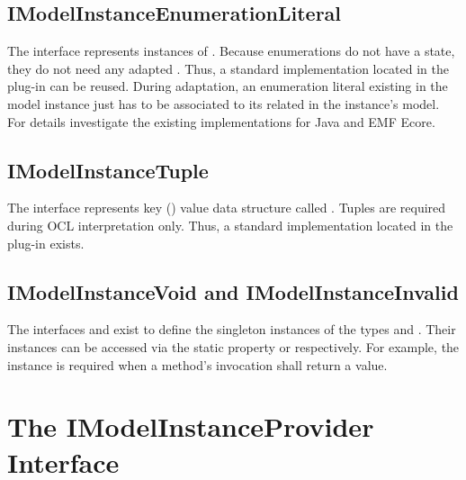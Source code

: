 \subsection{IModelInstanceEnumerationLiteral}

The interface  represents instances of . Because enumerations do not have a state, they do not need any adapted . Thus, a standard  implementation located in the plug-in  can be reused. During adaptation, an enumeration literal existing in the model instance just has to be associated to its related  in the instance's model. For details investigate the existing  implementations for Java and \acs{EMF} Ecore.


\subsection{IModelInstanceTuple}

The interface  represents key () value  data structure called . Tuples are required during \acs{OCL} interpretation only. Thus, a standard  implementation located in the plug-in  exists.


\subsection{IModelInstanceVoid and IModelInstanceInvalid}

The interfaces  and  exist to define the singleton instances of the types  and . Their instances can be accessed via the static property  or  respectively. For example, the  instance is required when a method's invocation shall return a  value.



\section{The IModelInstanceProvider Interface}

